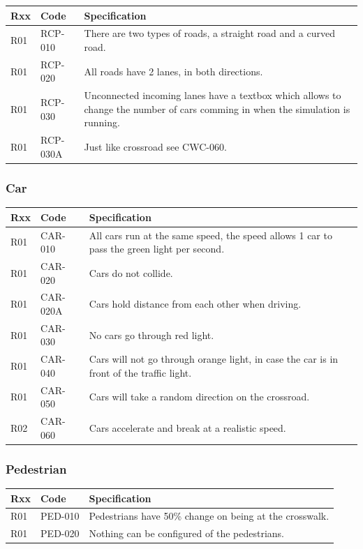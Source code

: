 \begin{tabularx}{\textwidth}{|p{0.5cm}p{2cm}X|}\hline
	Rxx & Code & Specification \\\hline
	R01 & RCP-010 & There are two types of roads, a straight road and a curved road.\\\hline
	R01 & RCP-020 & All roads have 2 lanes, in both directions.\\\hline
	R01 & RCP-030 & Unconnected incoming lanes have a textbox which allows to change the number of cars comming in when the simulation is running.\\\hline
	R01 & RCP-030A & Just like crossroad see CWC-060.\\\hline
\end{tabularx}

\subsubsection{Car}
\begin{tabularx}{\textwidth}{|p{0.5cm}p{2cm}X|}\hline
	Rxx & Code & Specification \\\hline
	R01 & CAR-010 & All cars run at the same speed, the speed allows 1 car to pass the green light per second.\\\hline
	R01 & CAR-020 & Cars do not collide.\\\hline
	R01 & CAR-020A & Cars hold distance from each other when driving.\\\hline
	R01 & CAR-030 & No cars go through red light.\\\hline
	R01 & CAR-040 & Cars will not go through orange light, in case the car is in front of the traffic light.\\\hline
	R01 & CAR-050 & Cars will take a random direction on the crossroad.\\\hline
	R02 & CAR-060 & Cars accelerate and break at a realistic speed.\\\hline
\end{tabularx}

\subsubsection{Pedestrian}
\begin{tabularx}{\textwidth}{|p{0.5cm}p{2cm}X|}\hline
	Rxx & Code & Specification \\\hline
	R01 & PED-010 & Pedestrians have 50\% change on being at the crosswalk.\\\hline
	R01 & PED-020 & Nothing can be configured of the pedestrians.\\\hline
\end{tabularx}

